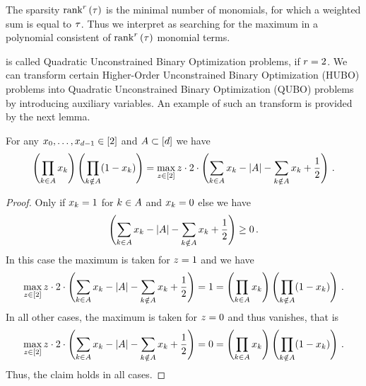 The sparsity $\mathrm{rank}^{r}\left(\tau\right)$ is the minimal number of monomials, for which a weighted sum is equal to $\tau$.
Thus we interpret  as searching for the maximum in a polynomial consistent of $\mathrm{rank}^{r}\left(\tau\right)$ monomial terms.

 is called Quadratic Unconstrained Binary Optimization problems, if $r=2$.
We can transform certain Higher-Order Unconstrained Binary Optimization (HUBO) problems into Quadratic Unconstrained Binary Optimization (QUBO) problems by introducing auxiliary variables.
An example of such an transform is provided by the next lemma.

\begin{lemma}
    \label{lem:monomialToQUBO}
    For any ${x_{0},\ldots,x_{d-1}}\in[2]$ and $A\subset[d]$ we have
    \begin{align*}
        \left( \prod_{\atomenumerator\in\variableset} \atomlegindexof{\atomenumerator } \right)  \left(  \prod_{\atomenumerator\notin\variableset} (1- \atomlegindexof{\atomenumerator }) \right) =
        \max_{\slackvariable\in[2]} \slackvariable \cdot 2 \cdot \left( \sum_{\atomenumerator\in\variableset}\atomlegindexof{\atomenumerator}  - \cardof{\variableset} - \sum_{\atomenumerator\notin\variableset}\atomlegindexof{\atomenumerator} + \frac{1}{2} \right) \, . %
    \end{align*}
\end{lemma}
\begin{proof} %
    Only if $x_{k}=1$ for $k\in A$ and $x_{k}=0$ else we have
    \[ \left( \sum_{k\in A}x_{k}  - \left|A\right| - \sum_{k\notin A}x_{k} + \frac{1}{2} \right) \geq 0 \, . \]
    In this case the maximum is taken for $z=1$ and we have
    \[ \max_{z\in[2]} z \cdot 2 \cdot \left( \sum_{k\in A}x_{k}  - \left|A\right| - \sum_{k\notin A}x_{k} + \frac{1}{2} \right)
    = 1 = \left( \prod_{k\in A} x_{k } \right)  \left(  \prod_{k\notin A} (1- x_{k }) \right) \, . \]
    In all other cases, the maximum is taken for $z=0$ and thus vanishes, that is
    \[ \max_{z\in[2]} z \cdot 2 \cdot \left( \sum_{k\in A}x_{k}  - \left|A\right| - \sum_{k\notin A}x_{k} + \frac{1}{2} \right)
    = 0 = \left( \prod_{k\in A} x_{k } \right)  \left(  \prod_{k\notin A} (1- x_{k }) \right) \, . \]
    Thus, the claim holds in all cases.
\end{proof}

